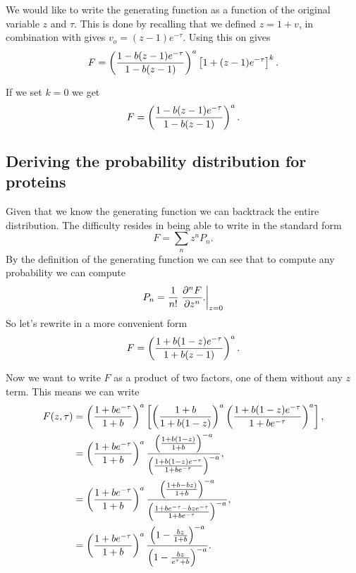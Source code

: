 We would like to write the generating function as a function of the original
variable $z$ and $\tau$. This is done by recalling that we defined $z = 1 + v$,
in combination with  gives $v_o = (z - 1) e^{-\tau}$.
Using this on  gives
\begin{equation}
  F = \left( {1 - b (z - 1) e^{-\tau}
  \over
  1 - b (z - 1)
  } \right)^a
  \left[ 1 + (z - 1) e^{-\tau} \right]^k.
\end{equation}

If we set $k = 0$ we get
\begin{equation}
  F = \left( {1 - b (z - 1) e^{-\tau}
  \over
  1 - b (z - 1)
  } \right)^a.
  \label{eq_generating_function_onz}
\end{equation}

\subsection{Deriving the probability distribution for proteins}

Given that we know the generating function we can backtrack the entire
distribution. The difficulty resides in being able to write
 in the standard form
\begin{equation}
  F = \sum_{n} z^n P_n.
\end{equation}
By the definition of the generating function we can see that to compute any
probability we can compute
\begin{equation}
  P_n = {1 \over n!} \left. {\partial ^n F \over \partial z^n}.
  \right\rvert_{z=0}
\end{equation}
So let's rewrite  in a more convenient form
\begin{equation}
  F = \left( {1 + b (1 - z) e^{-\tau}
  \over
  1 + b (z - 1)
  }  \right)^a.
\end{equation}

Now we want to write $F$ as a product of two factors, one of them without any
$z$ term. This means we can write
\begin{align}
  F(z, \tau) &= \left( {1 + b e^{-\tau} \over 1 + b } \right)^a
  \left[
  \left( {1 + b} \over 1 + b (1 - z) \right)^a
  \left( {1 + b (1 - z) e^{-\tau} \over 1 + b e^{-\tau}}  \right)^a
  \right], \\
  &= \left( {1 + b e^{-\tau} \over 1 + b } \right)^a
  { \left( {1 + b (1 - z) \over 1 + b} \right)^{-a}
  \over
  \left( {1 + b (1 - z) e^{-\tau} \over 1 + b e^{-\tau}} \right)^{-a}
  }, \\
  &= \left( {1 + b e^{-\tau} \over 1 + b } \right)^a
  { \left( {1 + b - b z) \over 1 + b} \right)^{-a}
  \over
  \left( {1 + b e^{-\tau} - b z e^{-\tau} \over 1 + b e^{-\tau}} \right)^{-a}
  }, \\
  &= \left( {1 + b e^{-\tau} \over 1 + b } \right)^a
  { \left( 1 - {b z \over 1 + b} \right)^{-a}
  \over
  \left( 1 - {b z \over e^{\tau} + b} \right)^{-a}
  }.
\end{align}
